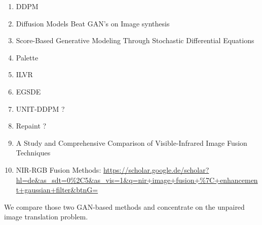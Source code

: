 \begin{enumerate}
    \item DDPM \cite{ddpm}
    \item Diffusion Models Beat GAN's on Image synthesis \cite{diffusion-beats-gans}
    \item Score-Based Generative Modeling Through Stochastic Differential Equations \cite{sbgm}
    \item Palette \cite{palette}
    \item ILVR \cite{ilvr}
    \item EGSDE \cite{egsde}
    \item UNIT-DDPM ? \cite{unit-ddpm}
    \item Repaint ? \cite{repaint}
    \item A Study and Comprehensive Comparison of Visible-Infrared Image Fusion Techniques \cite{study-vis-nir-fusion}
    \item NIR-RGB Fusion Methods: \url{https://scholar.google.de/scholar?hl=de&as_sdt=0%2C5&as_vis=1&q=nir+image+fusion+%7C+enhancement+gaussian+filter&btnG=}
\end{enumerate}


We compare those two GAN-based methods and concentrate on the unpaired image translation problem.


